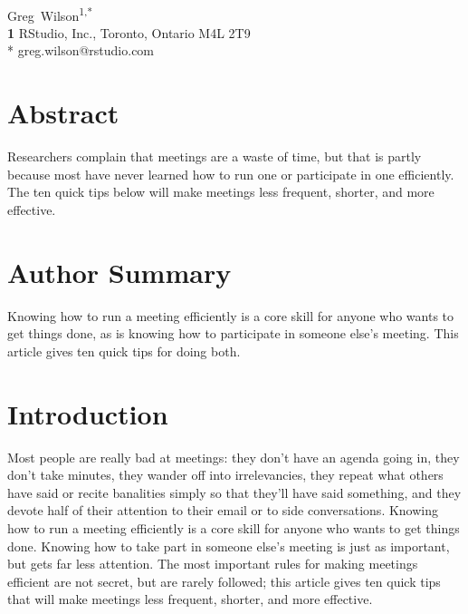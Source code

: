 \documentclass[10pt,letterpaper]{article}
\begin{document}
\vspace*{0.2in}

\begin{flushleft}
{\Large
\textbf{}
}
\newline
\\
{Greg~Wilson}\textsuperscript{1,*}
\\
\textbf{1} RStudio, Inc., Toronto, Ontario M4L 2T9
\\
\bigskip
* greg.wilson@rstudio.com
\end{flushleft}

\section*{Abstract}

Researchers complain that meetings are a waste of time, but that is partly
because most have never learned how to run one or participate in one
efficiently. The ten quick tips below will make meetings less frequent, shorter,
and more effective.

\section*{Author Summary}

Knowing how to run a meeting efficiently is a core skill for anyone who wants to
get things done, as is knowing how to participate in someone else's meeting.
This article gives ten quick tips for doing both.

\section*{Introduction}

Most people are really bad at meetings: they don't have an agenda going in, they
don't take minutes, they wander off into irrelevancies, they repeat what others
have said or recite banalities simply so that they'll have said something, and
they devote half of their attention to their email or to side conversations.
Knowing how to run a meeting efficiently is a core skill for anyone who wants to
get things done.  Knowing how to take part in someone else's meeting is just as
important, but gets far less attention. The most important rules for making
meetings efficient are not secret, but are rarely followed; this article gives
ten quick tips that will make meetings less frequent, shorter, and more
effective.
\end{document}
